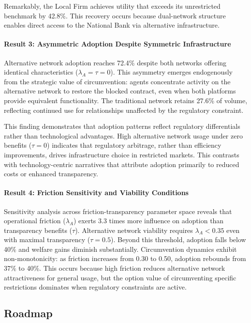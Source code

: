 \documentclass[12pt]{article}
\begin{document}
Remarkably, the Local Firm achieves utility that exceeds its unrestricted benchmark by 42.8\%. This recovery occurs because dual-network structure enables direct access to the National Bank via alternative infrastructure.

\paragraph{Result 3: Asymmetric Adoption Despite Symmetric Infrastructure}

Alternative network adoption reaches 72.4\% despite both networks offering identical characteristics ($\lambda_A = \tau = 0$). This asymmetry emerges endogenously from the strategic value of circumvention: agents concentrate activity on the alternative network to restore the blocked contract, even when both platforms provide equivalent functionality. The traditional network retains 27.6\% of volume, reflecting continued use for relationships unaffected by the regulatory constraint.

This finding demonstrates that adoption patterns reflect regulatory differentials rather than technological advantages. High alternative network usage under zero benefits ($\tau = 0$) indicates that regulatory arbitrage, rather than efficiency improvements, drives infrastructure choice in restricted markets. This contrasts with technology-centric narratives that attribute adoption primarily to reduced costs or enhanced transparency.

\paragraph{Result 4: Friction Sensitivity and Viability Conditions}

Sensitivity analysis across friction-transparency parameter space reveals that operational friction ($\lambda_A$) exerts 3.3 times more influence on adoption than transparency benefits ($\tau$). Alternative network viability requires $\lambda_A < 0.35$ even with maximal transparency ($\tau = 0.5$). Beyond this threshold, adoption falls below 40\% and welfare gains diminish substantially. Circumvention dynamics exhibit non-monotonicity: as friction increases from 0.30 to 0.50, adoption rebounds from 37\% to 40\%. This occurs because high friction reduces alternative network attractiveness for general usage, but the option value of circumventing specific restrictions dominates when regulatory constraints are active.

\subsection{Roadmap}
\end{document}
